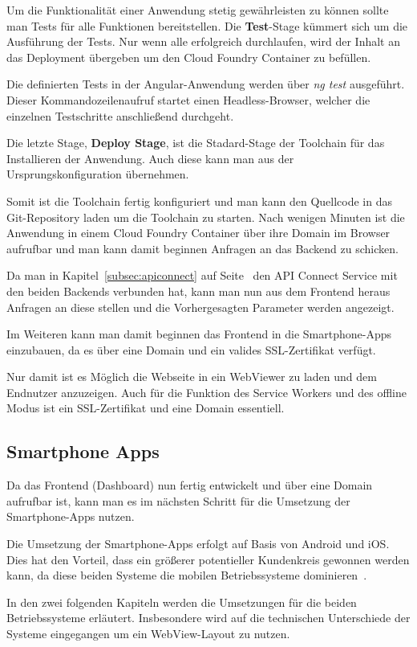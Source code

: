 Um die Funktionalität einer Anwendung stetig gewährleisten zu können sollte man Tests für alle Funktionen bereitstellen.
Die \textbf{Test}-Stage kümmert sich um die Ausführung der Tests. Nur wenn alle erfolgreich durchlaufen, wird der Inhalt
an das Deployment übergeben um den Cloud Foundry Container zu befüllen.

Die definierten Tests in der Angular-Anwendung werden über \textit{ng test} ausgeführt. Dieser Kommandozeilenaufruf
startet einen Headless-Browser, welcher die einzelnen Testschritte anschließend durchgeht.

Die letzte Stage, \textbf{Deploy Stage}, ist die Stadard-Stage der Toolchain für das Installieren der Anwendung. Auch
diese kann man aus der Ursprungskonfiguration übernehmen.

Somit ist die Toolchain fertig konfiguriert und man kann den Quellcode in das Git-Repository laden um die Toolchain zu
starten. Nach wenigen Minuten ist die Anwendung in einem Cloud Foundry Container über ihre Domain im Browser aufrufbar
und man kann damit beginnen Anfragen an das Backend zu schicken.

Da man in Kapitel~\ref{subsec:apiconnect} auf Seite~\pageref{subsec:apiconnect} den API Connect Service mit den beiden
Backends verbunden hat, kann man nun aus dem Frontend heraus Anfragen an diese stellen und die Vorhergesagten Parameter
werden angezeigt.

Im Weiteren kann man damit beginnen das Frontend in die Smartphone-Apps einzubauen, da es über eine Domain und ein
valides SSL-Zertifikat verfügt.

Nur damit ist es Möglich die Webseite in ein WebViewer zu laden und dem Endnutzer anzuzeigen. Auch für die
Funktion des Service Workers und des offline Modus ist ein SSL-Zertifikat und eine Domain essentiell.

\subsection{Smartphone Apps}
Da das Frontend (Dashboard) nun fertig entwickelt und über eine Domain aufrufbar ist, kann man es im nächsten Schritt
für die Umsetzung der Smartphone-Apps nutzen.

Die Umsetzung der Smartphone-Apps erfolgt auf Basis von Android und iOS. Dies hat den Vorteil, dass ein größerer
potentieller Kundenkreis gewonnen werden kann, da diese beiden Systeme die mobilen Betriebssysteme
dominieren~\cite{online_umsetzung_mobileos}.

In den zwei folgenden Kapiteln werden die Umsetzungen für die beiden Betriebssysteme erläutert. Insbesondere wird auf
die technischen Unterschiede der Systeme eingegangen um ein WebView-Layout zu nutzen.

